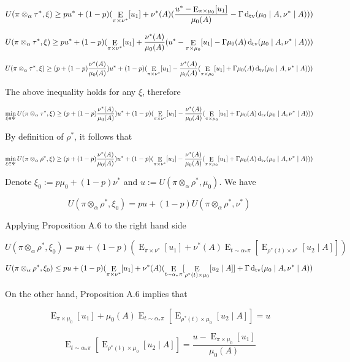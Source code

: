 \documentclass[a4paper]{article}
\DeclareMathOperator{\E}{E}
\newcommand{\Dtv}{\operatorname{d}_{\textnormal{tv}}}
\begin{document}
$$U(\pi \otimes_\alpha \tau^*, \xi) \geq pu^* + (1-p) (\E_{\pi \times \nu^*}[u_1] + \nu^*(A)(\frac{u^* - \E_{\pi \times \mu_0}[u_1]}{\mu_0(A)}- \Gamma\Dtv(\mu_0 \mid A, \nu^* \mid A)))$$

$$U(\pi \otimes_\alpha \tau^*, \xi) \geq pu^* + (1-p) (\E_{\pi \times \nu^*}[u_1] + \frac{\nu^*(A)}{\mu_0(A)}(u^* - \E_{\pi \times \mu_0}[u_1]- \Gamma\mu_0(A)\Dtv(\mu_0 \mid A, \nu^* \mid A)))$$

$$U(\pi \otimes_\alpha \tau^*, \xi) \geq (p + (1-p) \frac{\nu^*(A)}{\mu_0(A)})u^* + (1-p) (\E_{\pi \times \nu^*}[u_1] - \frac{\nu^*(A)}{\mu_0(A)}(\E_{\pi \times \mu_0}[u_1]+ \Gamma\mu_0(A)\Dtv(\mu_0 \mid A, \nu^* \mid A)))$$

The above inequality holds for any ${\xi}$, therefore

$$\min_{\xi \in \Psi} U(\pi \otimes_\alpha \tau^*, \xi) \geq (p + (1-p) \frac{\nu^*(A)}{\mu_0(A)})u^* + (1-p) (\E_{\pi \times \nu^*}[u_1] - \frac{\nu^*(A)}{\mu_0(A)}(\E_{\pi \times \mu_0}[u_1]+ \Gamma\mu_0(A)\Dtv(\mu_0 \mid A, \nu^* \mid A)))$$

By definition of ${\rho^*}$, it follows that

$$\min_{\xi \in \Psi} U(\pi \otimes_\alpha \rho^*, \xi) \geq (p + (1-p) \frac{\nu^*(A)}{\mu_0(A)})u^* + (1-p) (\E_{\pi \times \nu^*}[u_1] - \frac{\nu^*(A)}{\mu_0(A)}(\E_{\pi \times \mu_0}[u_1]+ \Gamma\mu_0(A)\Dtv(\mu_0 \mid A, \nu^* \mid A)))$$

Denote ${\xi_0:= p \mu_0 + (1-p) \nu^*}$ and ${u:=U(\pi \otimes_\alpha \rho^*, \mu_0)}$. We have

$$U(\pi \otimes_\alpha \rho^*, \xi_0) = pu + (1-p) U(\pi \otimes_\alpha \rho^*, \nu^*)$$

Applying Proposition A.6 to the right hand side

$$U(\pi \otimes_\alpha \rho^*, \xi_0) = pu + (1-p) (\E_{\pi \times \nu^*}[u_1] + \nu^*(A)\E_{t \sim \alpha_* \pi}[\E_{\rho^*(t) \times \nu^*}[u_2 \mid A]])$$

$$U(\pi \otimes_\alpha \rho^*, \xi_0) \leq pu + (1-p) (\E_{\pi \times \nu^*}[u_1] + \nu^*(A)(\E_{t \sim \alpha_* \pi}[\E_{\rho^*(t) \times \mu_0}[u_2 \mid A]]+\Gamma \Dtv(\mu_0 \mid A, \nu^* \mid A))$$

On the other hand, Proposition A.6 implies that

$$\E_{\pi \times \mu_0}[u_1] + \mu_0(A)\E_{t \sim \alpha_* \pi}[\E_{\rho^*(t) \times \mu_0}[u_2 \mid A]] = u$$

$$\E_{t \sim \alpha_* \pi}[\E_{\rho^*(t) \times \mu_0}[u_2 \mid A]] = \frac{u-\E_{\pi \times \mu_0}[u_1]}{\mu_0(A)}$$
\end{document}
